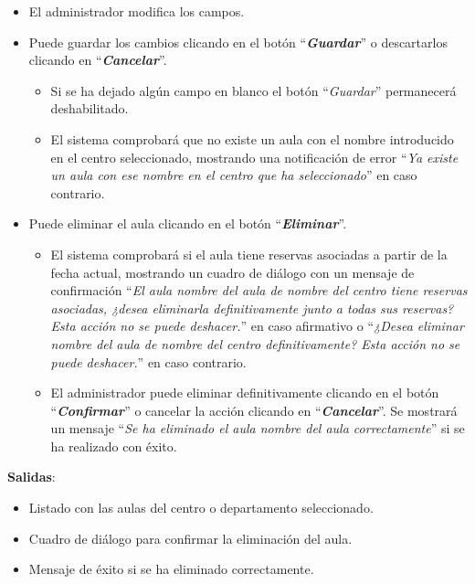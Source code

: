 \begin{enumerate}
\begin{itemize}
                \item El administrador modifica los campos.
                
                \item Puede guardar los cambios clicando en el botón ``\textbf{\textit{Guardar}}'' o descartarlos clicando en  ``\textbf{\textit{Cancelar}}''. 
                    \begin{itemize}
                    \tightlist
                        \item Si se ha dejado algún campo en blanco el botón ``\textit{Guardar}'' permanecerá deshabilitado.
                        
                        \item El sistema comprobará que no existe un aula con el nombre introducido en el centro seleccionado, mostrando una notificación de error ``\textit{Ya existe un aula con ese nombre en el centro que ha seleccionado}'' en caso contrario.
                    \end{itemize}
                
                \item Puede eliminar el aula clicando en el botón  ``\textbf{\textit{Eliminar}}''.
                    \begin{itemize}
                    \tightlist
                        \item El sistema comprobará si el aula tiene reservas asociadas a partir de la fecha actual, mostrando un cuadro de diálogo con un mensaje de confirmación ``\textit{El aula nombre del aula de nombre del centro tiene reservas asociadas, ¿desea eliminarla definitivamente junto a todas sus reservas? Esta acción no se puede deshacer.}'' en caso afirmativo o ``\textit{¿Desea eliminar nombre del aula de nombre del centro definitivamente? Esta acción no se puede deshacer.}'' en caso contrario.
                        
                        \item El administrador puede eliminar definitivamente clicando en el botón  ``\textbf{\textit{Confirmar}}'' o cancelar la acción clicando en  ``\textbf{\textit{Cancelar}}''. Se mostrará un mensaje ``\textit{Se ha eliminado el aula nombre del aula correctamente}'' si se ha realizado con éxito.
                    \end{itemize}
            \end{itemize}
    \end{enumerate}

\textbf{Salidas}: 
\begin{itemize}
\tightlist
    \item Listado con las aulas del centro o departamento seleccionado.
    
    \item Cuadro de diálogo para confirmar la eliminación del aula.
    
    \item Mensaje de éxito si se ha eliminado correctamente.
\end{itemize}

